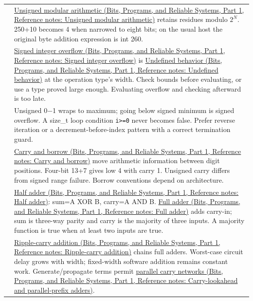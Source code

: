 {\begin{longtable}[]{@{}
  >{\raggedright\arraybackslash}p{}
  >{\raggedright\arraybackslash}p{}@{}}
28 & \href{../01-Bits-Programs-and-Reliable-Systems-P01/main.pdf\#nameddest=appendix-c99977d88b33}{Unsigned modular arithmetic (Bits, Programs, and Reliable Systems, Part 1, Reference notes: Unsigned modular arithmetic)} retains residues modulo \(2^N\). 250+10 becomes 4 when narrowed to eight bits; on the usual host the original byte addition expression is int 260. \\
29 & \href{../01-Bits-Programs-and-Reliable-Systems-P01/main.pdf\#nameddest=appendix-1a599c924a4e}{Signed integer overflow (Bits, Programs, and Reliable Systems, Part 1, Reference notes: Signed integer overflow)} is \href{../01-Bits-Programs-and-Reliable-Systems-P01/main.pdf\#nameddest=appendix-f558f5b4d8f2}{Undefined behavior (Bits, Programs, and Reliable Systems, Part 1, Reference notes: Undefined behavior)} at the operation type's width. Check bounds before evaluating, or use a type proved large enough. Evaluating overflow and checking afterward is too late. \\
30 & Unsigned 0−1 wraps to maximum; going below signed minimum is signed overflow. A size\_t loop condition \texttt{i\textgreater{}=0} never becomes false. Prefer reverse iteration or a decrement-before-index pattern with a correct termination guard. \\
31 & \href{../01-Bits-Programs-and-Reliable-Systems-P01/main.pdf\#nameddest=appendix-d52d5f78ffd1}{Carry and borrow (Bits, Programs, and Reliable Systems, Part 1, Reference notes: Carry and borrow)} move arithmetic information between digit positions. Four-bit 13+7 gives low 4 with carry 1. Unsigned carry differs from signed range failure. Borrow conventions depend on architecture. \\
32 & \href{../01-Bits-Programs-and-Reliable-Systems-P01/main.pdf\#nameddest=appendix-1652d27a8e90}{Half adder (Bits, Programs, and Reliable Systems, Part 1, Reference notes: Half adder)}: sum=A XOR B, carry=A AND B. \href{../01-Bits-Programs-and-Reliable-Systems-P01/main.pdf\#nameddest=appendix-d1a5b1e520c2}{Full adder (Bits, Programs, and Reliable Systems, Part 1, Reference notes: Full adder)} adds carry-in; sum is three-way parity and carry is the majority of three inputs. A majority function is true when at least two inputs are true. \\
33 & \href{../01-Bits-Programs-and-Reliable-Systems-P01/main.pdf\#nameddest=appendix-17917d9fdbe3}{Ripple-carry addition (Bits, Programs, and Reliable Systems, Part 1, Reference notes: Ripple-carry addition)} chains full adders. Worst-case circuit delay grows with width; fixed-width software addition remains constant work. Generate/propagate terms permit \href{../01-Bits-Programs-and-Reliable-Systems-P01/main.pdf\#nameddest=appendix-b5c46b2d94ff}{parallel carry networks (Bits, Programs, and Reliable Systems, Part 1, Reference notes: Carry-lookahead and parallel-prefix adders)}. \\

\end{longtable}}
